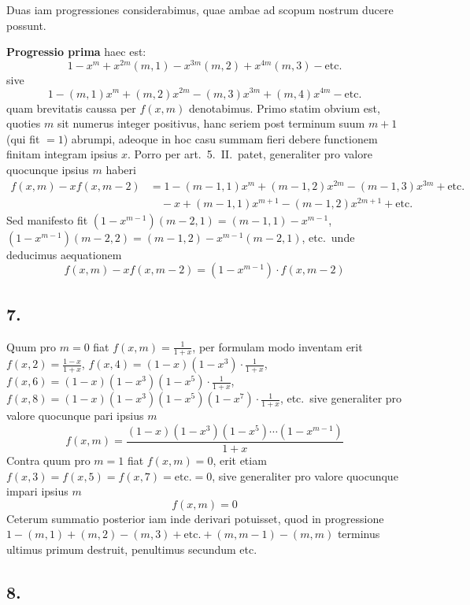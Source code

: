 \documentclass[12pt,a4paper]{article}
\theoremstyle{plain}
\begin{document}
Duas iam progressiones considerabimus, quae ambae ad scopum nostrum ducere possunt.

\medskip
\noindent\textbf{Progressio prima} haec est:
\[
1 - x^m + x^{2m}(m, 1) - x^{3m}(m, 2) + x^{4m}(m, 3) - \text{etc.}
\]
sive
\[
1 - (m, 1)x^m + (m, 2)x^{2m} - (m, 3)x^{3m} + (m, 4)x^{4m} - \text{etc.}
\]
quam brevitatis caussa per $f(x, m)$ denotabimus. Primo statim obvium est, quoties $m$ sit numerus integer positivus, hanc seriem post terminum suum $m+1$ (qui fit $=1$) abrumpi, adeoque in hoc casu summam fieri debere functionem finitam integram ipsius $x$. Porro per art.\ 5.\ II.\ patet, generaliter pro valore quocunque ipsius $m$ haberi
\begin{align*}
f(x, m) - xf(x, m-2) &= 1 - (m-1, 1)x^m + (m-1, 2)x^{2m} - (m-1, 3)x^{3m} + \text{etc.}\\
&\quad - x + (m-1, 1)x^{m+1} - (m-1, 2)x^{2m+1} + \text{etc.}
\end{align*}
Sed manifesto fit $(1-x^{m-1})(m-2, 1) = (m-1, 1) - x^{m-1}$, $(1-x^{m-1})(m-2, 2) = (m-1, 2) - x^{m-1}(m-2, 1)$, etc.\ unde deducimus aequationem
\[
f(x, m) - xf(x, m-2) = (1-x^{m-1}) \cdot f(x, m-2)
\]

\subsection*{7.}

Quum pro $m = 0$ fiat $f(x, m) = \frac{1}{1+x}$, per formulam modo inventam erit $f(x, 2) = \frac{1-x}{1+x}$, $f(x, 4) = (1-x)(1-x^3) \cdot \frac{1}{1+x}$, $f(x, 6) = (1-x)(1-x^3)(1-x^5) \cdot \frac{1}{1+x}$, $f(x, 8) = (1-x)(1-x^3)(1-x^5)(1-x^7) \cdot \frac{1}{1+x}$, etc.\ sive generaliter pro valore quocunque pari ipsius $m$
\[
f(x, m) = \frac{(1-x)(1-x^3)(1-x^5) \cdots (1-x^{m-1})}{1+x}
\]
Contra quum pro $m = 1$ fiat $f(x, m) = 0$, erit etiam $f(x, 3) = f(x, 5) = f(x, 7) = \text{etc.} = 0$, sive generaliter pro valore quocunque impari ipsius $m$
\[
f(x, m) = 0
\]
Ceterum summatio posterior iam inde derivari potuisset, quod in progressione $1 - (m, 1) + (m, 2) - (m, 3) + \text{etc.} + (m, m-1) - (m, m)$ terminus ultimus primum destruit, penultimus secundum etc.

\subsection*{8.}
\end{document}
